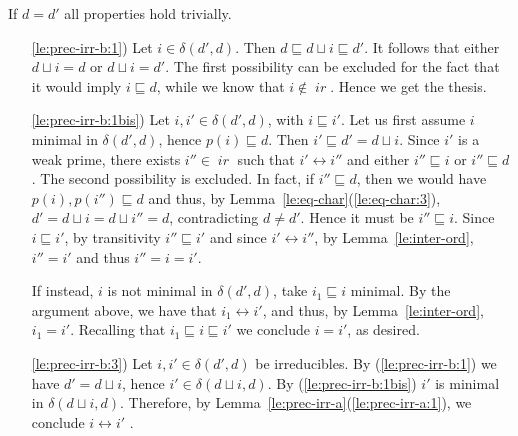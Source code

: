 \documentclass[conference]{IEEEtran}
\renewenvironment{proof}{\begin{IEEEproof}}{\end{IEEEproof}}
\newcommand{\ir}[1]{\ensuremath{\mathop{\mathit{ir}({#1})}}}
\newcommand{\diff}[2]{\ensuremath{\delta({#1},{#2})}}
\newcommand{\pred}[1]{\ensuremath{\mathit{p}({#1})}}
\begin{document}
\begin{proof}
If $ d = d'$ all properties hold trivially.
\begin{enumerate}
\item[\ref{le:prec-irr-b:1})] Let $i \in \diff{d'}{d}$. Then
  $d \sqsubseteq d \sqcup i \sqsubseteq d'$. It follows that either
  $d \sqcup i = d$ or $d \sqcup i = d'$. The first possibility can be
  excluded for the fact that it would imply $i \sqsubseteq d$, while we
  know that $i \not\in \ir{d}$. Hence we get the thesis.

\item[\ref{le:prec-irr-b:1bis})] Let $i, i' \in \diff{d'}{d}$, with
  $i \sqsubseteq i'$. Let us first assume $i$ minimal  in
  $\diff{d'}{d}$, hence $\pred{i} \sqsubseteq d$. Then
  $i' \sqsubseteq d' = d \sqcup i$. Since $i'$ is a weak prime, there
  exists $i'' \in \ir{D}$ such that {$i' \leftrightarrow i''$} 
  and either $i'' \sqsubseteq i$ or $i'' \sqsubseteq d$. The second
  possibility is excluded. In fact, if $i'' \sqsubseteq d$, then we
  would have $\pred{i}, \pred{i''} \sqsubseteq d$ and thus, by
  Lemma~\ref{le:eq-char}(\ref{le:eq-char:3}),
  $d' = d \sqcup i = d \sqcup i'' = d$, contradicting $d \neq
  d'$. Hence it must be $i'' \sqsubseteq i$. Since
  $i \sqsubseteq i'$, by transitivity $i'' \sqsubseteq i'$ and since
  {$i' \leftrightarrow i''$}, 
  by Lemma~\ref{le:inter-ord},  $i''=i'$ and thus $i''=i=i'$.

  If instead, $i$ is not minimal in $\diff{d'}{d}$, take
  $i_1 \sqsubseteq i$ minimal. By the argument above, we have that
  $i_1 \leftrightarrow i'$, and thus, by Lemma~\ref{le:inter-ord},
  $i_1=i'$. Recalling that $i_1 \sqsubseteq i \sqsubseteq i'$ we
  conclude $i=i'$, as desired.


\item[\ref{le:prec-irr-b:3})] Let $i, i' \in \diff{d'}{d}$ be
  irreducibles. By (\ref{le:prec-irr-b:1}) we have $d' = d \sqcup i$,
  hence $i' \in \diff{d \sqcup i}{d}$. By (\ref{le:prec-irr-b:1bis})
  $i'$ is minimal in $\diff{d \sqcup i}{d}$. Therefore, by
  Lemma~\ref{le:prec-irr-a}(\ref{le:prec-irr-a:1}), we conclude
  $i \leftrightarrow i'$ .
\end{enumerate}
\end{proof}
\end{document}

